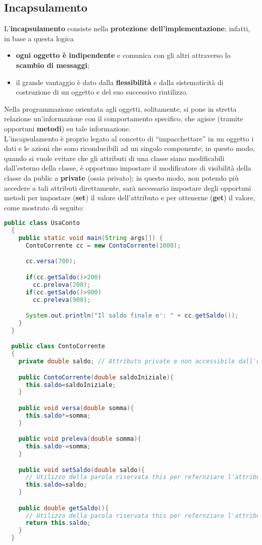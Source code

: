 \documentclass[a4paper]{extarticle}
\newcommand{\quotes}[1]{``#1''}
\begin{document}
\subsection{Incapsulamento}
L'\textbf{incapsulamento} consiste nella \textbf{protezione dell’implementazione}; infatti, in base a questa logica
\begin{itemize}
  \item \textbf{ogni oggetto è indipendente} e comunica con gli altri attraverso lo \textbf{scambio di messaggi};
  \item il grande vantaggio è dato dalla \textbf{flessibilità} e dalla sistematicità di costruzione di un oggetto e del suo successivo riutilizzo.
\end{itemize}
Nella programmazione orientata agli oggetti, solitamente, si pone in stretta relazione un'informazione con il comportamento specifico, che agisce (tramite opportuni \textbf{metodi}) su tale informazione.\\
L’incapsulamento è proprio legato al concetto di \quotes{impacchettare} in un oggetto i dati e le azioni che sono riconducibili ad un singolo componente; in questo modo, quando si vuole evitare che gli attributi di una classe siano modificabili dall’esterno della classe, è opportuno impostare il modificatore di visibilità della classe da public a \textbf{private} (ossia privato); in questo modo, non potendo più accedere a tali attributi direttamente, sarà necessario impostare degli opportuni metodi per impostare (\textbf{set}) il valore dell'attributo e per ottenerne (\textbf{get}) il valore, come mostrato di seguito:

\vspace{1em}
\noindent
\begin{lstlisting}[language=Java, caption=Esempio di incapsulamento in Java]
  public class UsaConto
  {
    public static void main(String args[]) {
      ContoCorrente cc = new ContoCorrente(1000);

      cc.versa(700);

      if(cc.getSaldo()>200)
        cc.preleva(200);
      if(cc.getSaldo()>900)
        cc.preleva(900);

      System.out.println("Il saldo finale e': " + cc.getSaldo());
    }
  }

  public class ContoCorrente
  {
    private double saldo; // Attributo private e non accessibile dall'esterno

    public ContoCorrente(double saldoIniziale){
      this.saldo=saldoIniziale;
    }

    public void versa(double somma){
      this.saldo*=somma;
    }

    public void preleva(double somma){
      this.saldo-=somma;
    }

    public void setSaldo(double saldo){
      // Utilizzo della parola riservata this per refernziare l'attributo della classe
      this.saldo=saldo;
    }

    public double getSaldo(){
      // Utilizzo della parola riservata this per refernziare l'attributo della classe
      return this.saldo;
    }
  }
\end{lstlisting}
\end{document}
